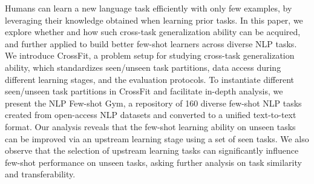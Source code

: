 Humans can learn a new language task efficiently with only few examples, by leveraging their knowledge obtained when learning prior tasks. In this paper, we explore whether and how such cross-task generalization ability can be acquired, and further applied to build better few-shot learners across diverse NLP tasks. We introduce CrossFit, a problem setup for studying cross-task generalization ability, which standardizes seen/unseen task partitions, data access during different learning stages, and the evaluation protocols. To instantiate different seen/unseen task partitions in CrossFit and facilitate in-depth analysis, we present the NLP Few-shot Gym, a repository of 160 diverse few-shot NLP tasks created from open-access NLP datasets and converted to a unified text-to-text format. Our analysis reveals that the few-shot learning ability on unseen tasks can be improved via an upstream learning stage using a set of seen tasks. We also observe that the selection of upstream learning tasks can significantly influence few-shot performance on unseen tasks, asking further analysis on task similarity and transferability.
